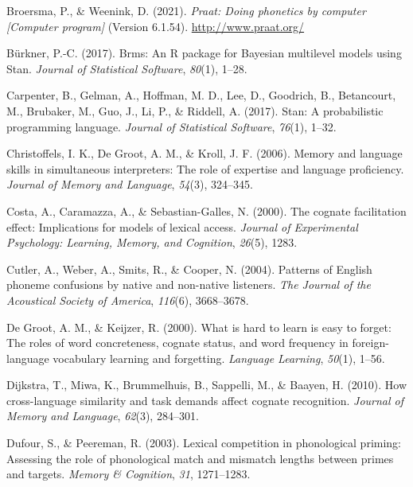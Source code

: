 \documentclass[
]{article}
\newlength{\cslhangindent}
\newenvironment{CSLReferences}[2] %
 {\begin{list}{}{%
  \setlength{\itemindent}{0pt}
  \setlength{\leftmargin}{0pt}
  \setlength{\parsep}{0pt}
  \ifodd #1
   \setlength{\leftmargin}{\cslhangindent}
   \setlength{\itemindent}{-1\cslhangindent}
  \fi
  \setlength{\itemsep}{#2\baselineskip}}}
 {\end{list}}
\begin{document}
\begin{CSLReferences}{1}{0}
Broersma, P., \& Weenink, D. (2021). \emph{Praat: Doing phonetics by
computer {[}{Computer} program{]}} (Version 6.1.54).
\url{http://www.praat.org/}

Bürkner, P.-C. (2017). Brms: {An R} package for {Bayesian} multilevel
models using {Stan}. \emph{Journal of Statistical Software},
\emph{80}(1), 1--28.

Carpenter, B., Gelman, A., Hoffman, M. D., Lee, D., Goodrich, B.,
Betancourt, M., Brubaker, M., Guo, J., Li, P., \& Riddell, A. (2017).
Stan: {A} probabilistic programming language. \emph{Journal of
Statistical Software}, \emph{76}(1), 1--32.

Christoffels, I. K., De Groot, A. M., \& Kroll, J. F. (2006). Memory and
language skills in simultaneous interpreters: {The} role of expertise
and language proficiency. \emph{Journal of Memory and Language},
\emph{54}(3), 324--345.

Costa, A., Caramazza, A., \& Sebastian-Galles, N. (2000). The cognate
facilitation effect: Implications for models of lexical access.
\emph{Journal of Experimental Psychology: Learning, Memory, and
Cognition}, \emph{26}(5), 1283.

Cutler, A., Weber, A., Smits, R., \& Cooper, N. (2004). Patterns of
{English} phoneme confusions by native and non-native listeners.
\emph{The Journal of the Acoustical Society of America}, \emph{116}(6),
3668--3678.

De Groot, A. M., \& Keijzer, R. (2000). What is hard to learn is easy to
forget: The roles of word concreteness, cognate status, and word
frequency in foreign-language vocabulary learning and forgetting.
\emph{Language Learning}, \emph{50}(1), 1--56.

Dijkstra, T., Miwa, K., Brummelhuis, B., Sappelli, M., \& Baayen, H.
(2010). How cross-language similarity and task demands affect cognate
recognition. \emph{Journal of Memory and Language}, \emph{62}(3),
284--301.

Dufour, S., \& Peereman, R. (2003). Lexical competition in phonological
priming: {Assessing} the role of phonological match and mismatch lengths
between primes and targets. \emph{Memory \& Cognition}, \emph{31},
1271--1283.


\end{CSLReferences}
\end{document}
